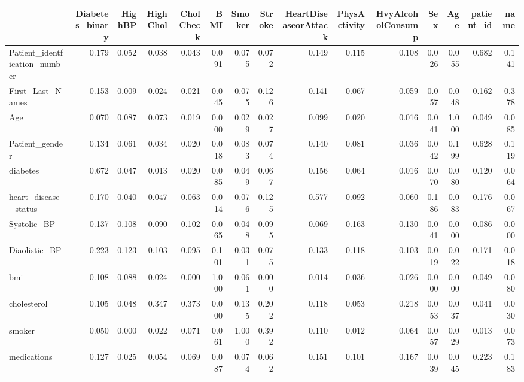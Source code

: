 \begin{tabular}{lrrrrrrrrrrrrrr}
\toprule
 & Diabetes_binary & HighBP & HighChol & CholCheck & BMI & Smoker & Stroke & HeartDiseaseorAttack & PhysActivity & HvyAlcoholConsump & Sex & Age & patient_id & name \\
\midrule
Patient_identfication_number & 0.179 & 0.052 & 0.038 & 0.043 & 0.091 & 0.075 & 0.072 & 0.149 & 0.115 & 0.108 & 0.026 & 0.055 & 0.682 & 0.141 \\
First_Last_Names & 0.153 & 0.009 & 0.024 & 0.021 & 0.045 & 0.075 & 0.126 & 0.141 & 0.067 & 0.059 & 0.057 & 0.048 & 0.162 & 0.378 \\
Age & 0.070 & 0.087 & 0.073 & 0.019 & 0.000 & 0.029 & 0.027 & 0.099 & 0.020 & 0.016 & 0.041 & 1.000 & 0.049 & 0.085 \\
Patient_gender & 0.134 & 0.061 & 0.034 & 0.020 & 0.018 & 0.083 & 0.074 & 0.140 & 0.081 & 0.036 & 0.042 & 0.199 & 0.628 & 0.119 \\
diabetes & 0.672 & 0.047 & 0.013 & 0.020 & 0.085 & 0.049 & 0.067 & 0.156 & 0.064 & 0.016 & 0.070 & 0.080 & 0.120 & 0.064 \\
heart_disease_status & 0.170 & 0.040 & 0.047 & 0.063 & 0.014 & 0.076 & 0.125 & 0.577 & 0.092 & 0.060 & 0.186 & 0.083 & 0.176 & 0.067 \\
Systolic_BP & 0.137 & 0.108 & 0.090 & 0.102 & 0.065 & 0.048 & 0.095 & 0.069 & 0.163 & 0.130 & 0.041 & 0.000 & 0.086 & 0.000 \\
Diaolistic_BP & 0.223 & 0.123 & 0.103 & 0.095 & 0.101 & 0.031 & 0.075 & 0.133 & 0.118 & 0.103 & 0.019 & 0.022 & 0.171 & 0.018 \\
bmi & 0.108 & 0.088 & 0.024 & 0.000 & 1.000 & 0.061 & 0.000 & 0.014 & 0.036 & 0.026 & 0.000 & 0.000 & 0.049 & 0.080 \\
cholesterol & 0.105 & 0.048 & 0.347 & 0.373 & 0.000 & 0.135 & 0.202 & 0.118 & 0.053 & 0.218 & 0.053 & 0.037 & 0.041 & 0.030 \\
smoker & 0.050 & 0.000 & 0.022 & 0.071 & 0.061 & 1.000 & 0.392 & 0.110 & 0.012 & 0.064 & 0.057 & 0.029 & 0.013 & 0.073 \\
medications & 0.127 & 0.025 & 0.054 & 0.069 & 0.087 & 0.074 & 0.062 & 0.151 & 0.101 & 0.167 & 0.039 & 0.045 & 0.223 & 0.183 \\
\bottomrule
\end{tabular}
